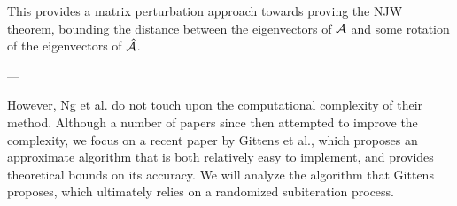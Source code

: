 This provides a matrix perturbation approach towards proving the NJW theorem,
bounding the distance between the eigenvectors of $\mathcal{A}$ and some rotation of
the eigenvectors of $\hat{\mathcal{A}}$.

---

However, Ng et al. do not touch upon the computational complexity of their
method. Although a number of papers since then attempted to improve the
complexity, we focus on a recent paper by Gittens et
al.\cite{gittens2013approximate}, which proposes an approximate algorithm that
is both relatively easy to implement, and provides theoretical bounds on its
accuracy. We will analyze the algorithm that Gittens proposes, which ultimately
relies on a randomized subiteration process.
